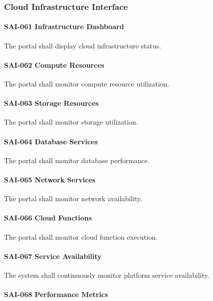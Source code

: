 \subsubsection*{Cloud Infrastructure Interface}

\paragraph{SAI-061 Infrastructure Dashboard}

The portal shall display cloud infrastructure status.

\paragraph{SAI-062 Compute Resources}

The portal shall monitor compute resource utilization.

\paragraph{SAI-063 Storage Resources}

The portal shall monitor storage utilization.

\paragraph{SAI-064 Database Services}

The portal shall monitor database performance.

\paragraph{SAI-065 Network Services}

The portal shall monitor network availability.

\paragraph{SAI-066 Cloud Functions}

The portal shall monitor cloud function execution.

\paragraph{SAI-067 Service Availability}

The system shall continuously monitor platform service availability.

\paragraph{SAI-068 Performance Metrics}

